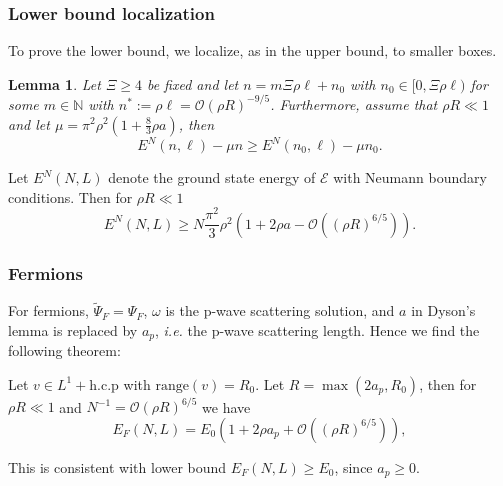 \documentclass{beamer}[10]
\newcommand{\ie}{\emph{i.e.} }
\newtheorem{mlemma}{Lemma}
\begin{document}
\begin{frame}
	\frametitle{Lower bound localization}
	\begin{block}{}
	\small	To prove the lower bound, we localize, as in the upper bound, to smaller boxes.
		\begin{mlemma}\label{LemmaLocalizationFbound}
			Let $ \Xi\geq 4 $ be fixed and let $ n=m\Xi \rho \ell+n_0 $ with $ n_0\in[0,\Xi\rho \ell) $ for some $ m\in\mathbb{N} $ with $ n^{\ast}:=\rho\ell=\mathcal{O}(\rho R)^{-9/5} $. Furthermore, assume that $ \rho R\ll 1 $ and let $ \mu=\pi^2\rho^2\left(1+\frac{8}{3}\rho a\right) $, then \begin{equation}
			E^{N}(n,\ell)-\mu n \geq E^{N}(n_0,\ell)-\mu n_0.
			\end{equation}
		\end{mlemma}
		\begin{theorem} Let $ E^N(N,L) $ denote the ground state energy of $ \mathcal{E} $ with Neumann boundary conditions. Then for $ \rho R \ll 1 $
			\begin{equation}
			E^N(N,L)\geq N\frac{\pi^2}{3}\rho^2\left(1+2\rho a-\mathcal{O}\left((\rho R)^{6/5}\right)\right).
			\end{equation}
		\end{theorem}
	\end{block}	
\end{frame}
\begin{frame}
	\frametitle{Fermions}
	For fermions, $ \tilde{\Psi}_F=\Psi_F $, $ \omega $ is the p-wave scattering solution, and  $ a $ in Dyson's lemma is replaced by $ a_p $, \ie the p-wave scattering length. Hence we find the following theorem:
	\begin{theorem}[Fermions]
		Let $ v\in L^{1}+\text{h.c.p} $ with $ \text{range}(v)=R_0 $. Let $ R=\max(2 a_p,R_0) $, then for $ \rho R\ll 1  $ and $ N^{-1}=\mathcal{O}(\rho R)^{6/5} $ we have \begin{equation}
		E_F(N,L)=E_0\left(1+2\rho a_p+ \mathcal{O}\left((\rho R)^{6/5}\right)\right),
		\end{equation} 
	\end{theorem}
	This is consistent with lower bound $ E_F(N,L)\geq E_0 $, since $ a_p\geq 0 $.
\end{frame}

\begin{frame}
\end{frame}
\end{document}
